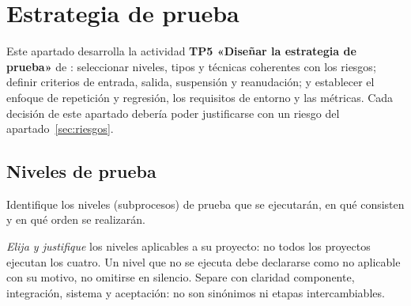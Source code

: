 \section{Estrategia de prueba}
\label{sec:estrategia}

\begin{notanormativa}
Este apartado desarrolla la actividad \textbf{TP5 «Diseñar la estrategia de prueba»} de
: seleccionar niveles, tipos y técnicas coherentes con los riesgos; definir criterios
de entrada, salida, suspensión y reanudación; y establecer el enfoque de repetición y
regresión, los requisitos de entorno y las métricas. Cada decisión de este apartado debería
poder justificarse con un riesgo del apartado~\ref{sec:riesgos}.
\end{notanormativa}

\subsection{Niveles de prueba}
\label{sec:niveles}

\begin{instruccion}
Identifique los niveles (subprocesos) de prueba que se ejecutarán, en qué consisten y en qué
orden se realizarán.

\emph{Elija y justifique} los niveles aplicables a su proyecto: no todos los proyectos ejecutan
los cuatro. Un nivel que no se ejecuta debe declararse como no aplicable con su motivo, no
omitirse en silencio. Separe con claridad componente, integración, sistema y aceptación: no son
sinónimos ni etapas intercambiables.
\end{instruccion}

\begin{observacion}
\end{observacion}


